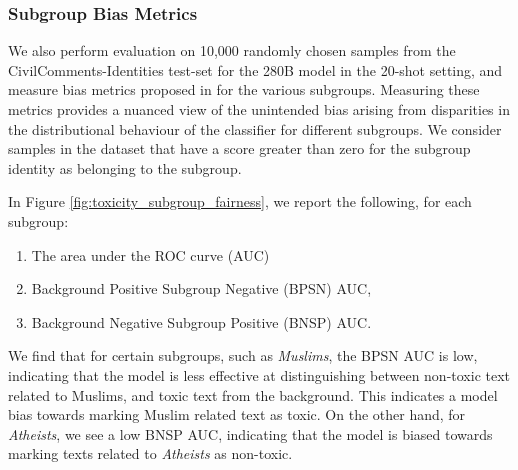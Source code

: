 \documentclass[11pt, a4paper, logo, internal, copyright, nonumbering]{deepmind}
\begin{document}
\subsubsection{Subgroup Bias Metrics}
We also perform evaluation on 10,000 randomly chosen samples from the CivilComments-Identities test-set \citep{nuanced_metrics} for the 280B model in the 20-shot setting, and measure bias metrics proposed in \cite{nuanced_metrics} for the various subgroups.
%
Measuring these metrics provides a nuanced view of the unintended bias arising from disparities in the distributional behaviour of the classifier for different subgroups.
%
We consider samples in the dataset that have a score greater than zero for the subgroup identity as belonging to the subgroup.
%

In Figure \ref{fig:toxicity_subgroup_fairness}, we report the following, for each subgroup:
\begin{enumerate}[label=(\alph*)]
    \item The area under the ROC curve (AUC)
    \item Background Positive Subgroup Negative (BPSN) AUC,
    \item Background Negative Subgroup Positive (BNSP) AUC.
\end{enumerate}
%
We find that for certain subgroups, such as \textit{Muslims}, the BPSN AUC is low, indicating that the model is less effective at distinguishing between non-toxic text related to Muslims, and toxic text from the background.
%
This indicates a model bias towards marking Muslim related text as toxic.
%
On the other hand, for \textit{Atheists}, we see a low BNSP AUC, indicating that
the model is biased towards marking texts related to \textit{Atheists} as non-toxic.
\end{document}
